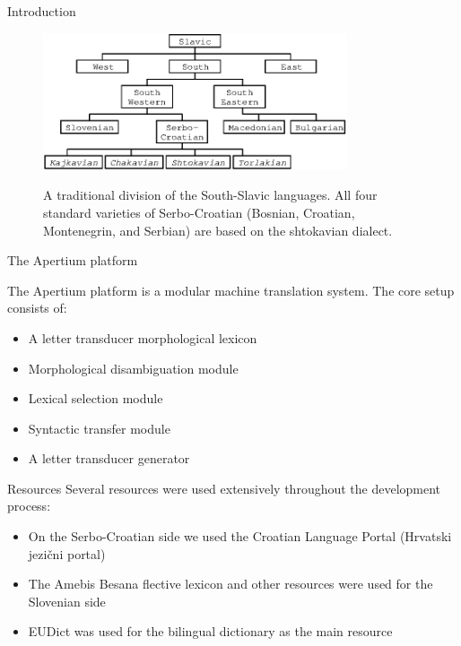 \documentclass{beamer}
\begin{document}
\begin{frame}{Introduction}

\begin{center}
	\begin{figure}
	\includegraphics[width=0.8\textwidth]{images/chart.eps}
	\label{fig:1}
	\caption{A traditional division of the South-Slavic languages. All four standard varieties of Serbo-Croatian (Bosnian, Croatian,
Montenegrin, and Serbian) are based on the shtokavian dialect.}
	\end{figure}
\end{center}
\end{frame}

\begin{frame}{The Apertium platform}

The Apertium platform is a modular machine translation system.
The core setup consists of:
\begin{itemize}
\item A letter transducer morphological lexicon
\item Morphological disambiguation module
\item Lexical selection module
\item Syntactic transfer module
\item A letter transducer generator
\end{itemize}
\end{frame}

\begin{frame}{Resources}
Several resources were used extensively throughout the development process:
\begin{itemize}
\item On the Serbo-Croatian side we used the Croatian Language Portal (Hrvatski jezi\v{c}ni portal)
\item The Amebis Besana flective lexicon and other resources were used for the Slovenian side
\item EUDict was used for the bilingual dictionary as the main resource

\end{itemize}
\end{frame}
\end{document}
